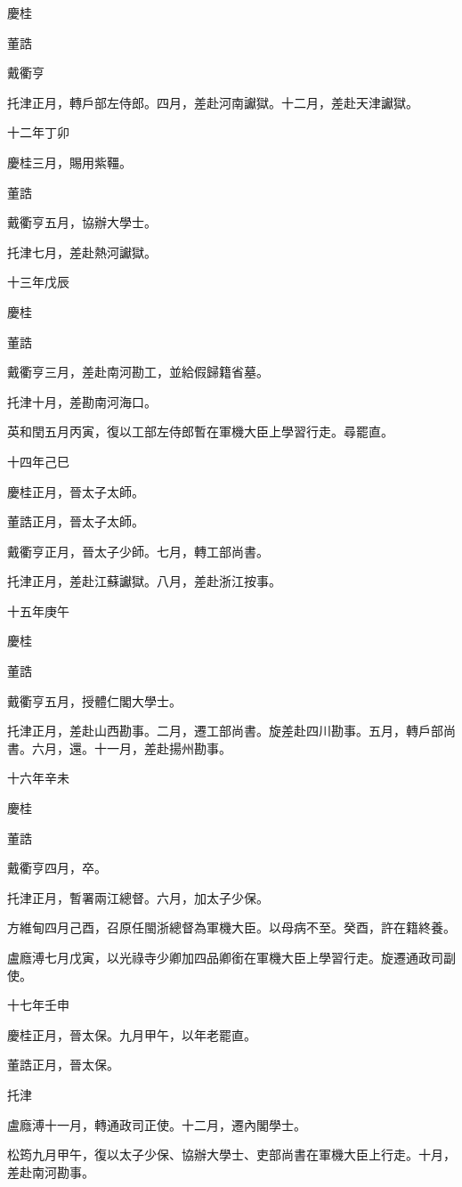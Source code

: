 \begin{pinyinscope}
慶桂

董誥

戴衢亨

托津正月，轉戶部左侍郎。四月，差赴河南讞獄。十二月，差赴天津讞獄。

十二年丁卯

慶桂三月，賜用紫韁。

董誥

戴衢亨五月，協辦大學士。

托津七月，差赴熱河讞獄。

十三年戊辰

慶桂

董誥

戴衢亨三月，差赴南河勘工，並給假歸籍省墓。

托津十月，差勘南河海口。

英和閏五月丙寅，復以工部左侍郎暫在軍機大臣上學習行走。尋罷直。

十四年己巳

慶桂正月，晉太子太師。

董誥正月，晉太子太師。

戴衢亨正月，晉太子少師。七月，轉工部尚書。

托津正月，差赴江蘇讞獄。八月，差赴浙江按事。

十五年庚午

慶桂

董誥

戴衢亨五月，授體仁閣大學士。

托津正月，差赴山西勘事。二月，遷工部尚書。旋差赴四川勘事。五月，轉戶部尚書。六月，還。十一月，差赴揚州勘事。

十六年辛未

慶桂

董誥

戴衢亨四月，卒。

托津正月，暫署兩江總督。六月，加太子少保。

方維甸四月己酉，召原任閩浙總督為軍機大臣。以母病不至。癸酉，許在籍終養。

盧廕溥七月戊寅，以光祿寺少卿加四品卿銜在軍機大臣上學習行走。旋遷通政司副使。

十七年壬申

慶桂正月，晉太保。九月甲午，以年老罷直。

董誥正月，晉太保。

托津

盧廕溥十一月，轉通政司正使。十二月，遷內閣學士。

松筠九月甲午，復以太子少保、協辦大學士、吏部尚書在軍機大臣上行走。十月，差赴南河勘事。


\end{pinyinscope}

